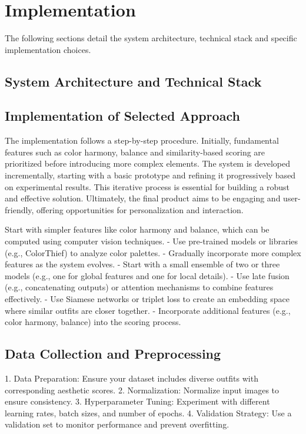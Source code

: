 \chapter{Implementation}

The following sections detail the system architecture, technical stack and specific implementation choices.

\section{System Architecture and Technical Stack}

\section{Implementation of Selected Approach}

The implementation follows a step-by-step procedure. Initially, fundamental features such as color harmony, balance and similarity-based scoring are prioritized before introducing more complex elements. The system is developed incrementally, starting with a basic prototype and refining it progressively based on experimental results. This iterative process is essential for building a robust and effective solution. Ultimately, the final product aims to be engaging and user-friendly, offering opportunities for personalization and interaction.

Start with simpler features like color harmony and balance, which can be computed using computer vision techniques.
- Use pre-trained models or libraries (e.g., ColorThief) to analyze color palettes.
- Gradually incorporate more complex features as the system evolves.
- Start with a small ensemble of two or three models (e.g., one for global features and one for local details).
- Use late fusion (e.g., concatenating outputs) or attention mechanisms to combine features effectively.
- Use Siamese networks or triplet loss to create an embedding space where similar outfits are closer together.
- Incorporate additional features (e.g., color harmony, balance) into the scoring process.

\section{Data Collection and Preprocessing}


1. Data Preparation: Ensure your dataset includes diverse outfits with corresponding aesthetic scores.
2. Normalization: Normalize input images to ensure consistency.
3. Hyperparameter Tuning: Experiment with different learning rates, batch sizes, and number of epochs.
4. Validation Strategy: Use a validation set to monitor performance and prevent overfitting.

